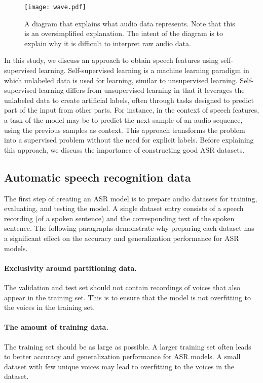 \begin{figure}
    \centering
    \captionsetup{justification=centering}
    \texttt{[image: wave.pdf]}
    \caption{A diagram that explains what audio data represents. Note that this is an oversimplified explanation. The intent of the diagram is to explain why it is difficult to interpret raw audio data.}
    \label{fig:wave}
\end{figure}

In this study, we discuss an approach to obtain speech features using self-supervised learning.
Self-supervised learning is a machine learning paradigm in which unlabeled data is used for learning, similar to unsupervised learning.
Self-supervised learning differs from unsupervised learning in that it leverages the unlabeled data to create artificial labels, 
often through tasks designed to predict part of the input from other parts. 
For instance, in the context of speech features, a task of the model may be to predict the next sample of an audio sequence, 
using the previous samples as context.
This approach transforms the problem into a supervised problem without the need for explicit labels. 
Before explaining this approach, we discuss the importance of constructing good ASR datasets.

\subsection{Automatic speech recognition data}
The first step of creating an ASR model is to prepare audio datasets for training, evaluating, and testing the model.
A single dataset entry consists of a speech recording (of a spoken sentence) and the corresponding text of the spoken sentence.
The following paragraphs demonstrate why preparing each dataset
has a significant effect on the accuracy and generalization performance for ASR models.

\paragraph*{Exclusivity around partitioning data.}
The validation and test set should not contain recordings of voices that also appear in the training set.
This is to ensure that the model is not overfitting to the voices in the training set.

\paragraph*{The amount of training data.}
The training set should be as large as possible.
A larger training set often leads to better accuracy and generalization performance for ASR models.
A small dataset with few unique voices may lead to overfitting to the voices in the dataset.

